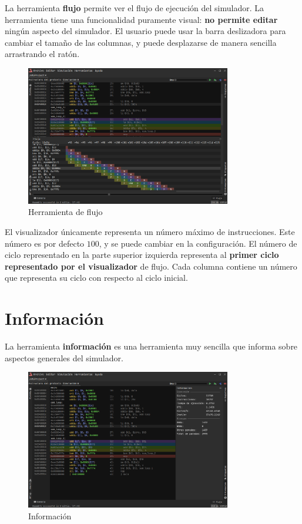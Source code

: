 La herramienta \textbf{flujo} permite ver el flujo de ejecución del simulador.
La herramienta tiene una funcionalidad puramente visual:
\textbf{no permite editar} ningún aspecto del simulador.
El usuario puede usar la barra deslizadora para cambiar el tamaño de las columnas,
y puede desplazarse de manera sencilla arrastrando el ratón.

\begin{figure}[H]
    \centering
    \includegraphics[width=0.8\textwidth]{images/tools/jams-flow}
    \caption{Herramienta de flujo}
    \label{fig:jams-flow}
\end{figure}

\noindent El visualizador únicamente representa un número máximo de instrucciones.
Este número es por defecto $100$, y se puede cambiar en la configuración.
El número de ciclo representado en la parte superior izquierda representa
al \textbf{primer ciclo representado por el visualizador} de flujo.
Cada columna contiene un número que representa su ciclo con respecto al ciclo inicial.

\section{Información}\label{sec:informacion}

La herramienta \textbf{información} es una herramienta muy sencilla
que informa sobre aspectos generales del simulador.

\begin{figure}[H]
    \centering
    \includegraphics[width=0.8\textwidth]{images/tools/jams-information}
    \caption{Información}
    \label{fig:jams-information}
\end{figure}

